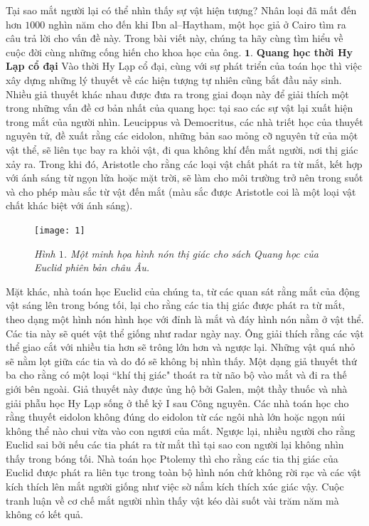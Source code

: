 \begin{multicols}{2}
	Tại sao mắt người lại có thể nhìn thấy sự vật hiện tượng? Nhân loại đã mất đến hơn $1000$ nghìn năm cho đến khi Ibn al--Haytham, một học giả ở Cairo tìm ra câu trả lời cho vấn đề này. Trong bài viết này, chúng ta hãy cùng tìm hiểu về cuộc đời cùng những cống hiến cho khoa học của ông.
	\vskip 0.1cm
	$\pmb{1.}$ \textbf{\color{lichsutoanhoc}Quang học thời Hy Lạp cổ đại}
	\vskip 0.1cm
	Vào thời Hy Lạp cổ đại, cùng với sự phát triển của toán học thì việc xây dựng những lý thuyết về các hiện tượng tự nhiên cũng bắt đầu nảy sinh. Nhiều giả thuyết khác nhau được đưa ra trong giai đoạn này để giải thích một trong những vấn đề cơ bản nhất của quang học: tại sao các sự vật lại xuất hiện trong mắt của người nhìn.
	\vskip 0.1cm
	Leucippus và Democritus, các nhà triết học của thuyết nguyên tử, đề xuất rằng các eidolon, những bản sao mỏng cỡ nguyên tử của một vật thể, sẽ liên tục bay ra khỏi vật, đi qua không khí đến mắt người, nơi thị giác xảy ra. Trong khi đó, Aristotle cho rằng các loại vật chất phát ra từ mắt, kết hợp với ánh sáng từ ngọn lửa hoặc mặt trời, sẽ làm cho môi trường trở nên trong suốt và cho phép màu sắc từ vật đến mắt (màu sắc được Aristotle coi là một loại vật chất khác biệt với ánh sáng).
	\begin{figure}[H]
		\vspace*{5pt}
		\centering
		\captionsetup{labelformat= empty, justification=centering}
		\texttt{[image: 1]}
		\caption{\small\textit{\color{lichsutoanhoc}Hình $1$. Một minh họa hình nón thị giác cho sách Quang học của Euclid phiên bản châu Âu.}}
		\vspace*{-10pt}
	\end{figure}
	Mặt khác, nhà toán học Euclid của chúng ta, từ các quan sát rằng mắt của động vật sáng lên trong bóng tối, lại cho rằng các tia thị giác được phát ra từ mắt, theo dạng một hình nón hình học với đỉnh là mắt và đáy hình nón nằm ở vật thể. Các tia này sẽ quét vật thể giống như radar ngày nay. Ông giải thích rằng các vật thể giao cắt với nhiều tia hơn sẽ trông lớn hơn và ngược lại. Những vật quá nhỏ sẽ nằm lọt giữa các tia và do đó sẽ không bị nhìn thấy.
	\vskip 0.1cm
	Một dạng giả thuyết thứ ba cho rằng có một loại ``khí thị giác" thoát ra từ não bộ vào mắt và đi ra thế giới bên ngoài. Giả thuyết này được ủng hộ bởi Galen, một thầy thuốc và nhà giải phẫu học Hy Lạp sống ở thế kỷ I sau Công nguyên.
	\vskip 0.1cm
	Các nhà toán học cho rằng thuyết eidolon không đúng do eidolon từ các ngôi nhà lớn hoặc ngọn núi không thể nào chui vừa vào con ngươi của mắt. Ngược lại, nhiều người cho rằng Euclid sai bởi nếu các tia phát ra từ mắt thì tại sao con người lại không nhìn thấy trong bóng tối. Nhà toán học Ptolemy thì cho rằng các tia thị giác của Euclid được phát ra liên tục trong toàn bộ hình nón chứ không rời rạc và các vật kích thích lên mắt người giống như việc sờ nắm kích thích xúc giác vậy. Cuộc tranh luận về cơ chế mắt người nhìn thấy vật kéo dài suốt vài trăm năm mà không có kết quả. 

\end{multicols}
